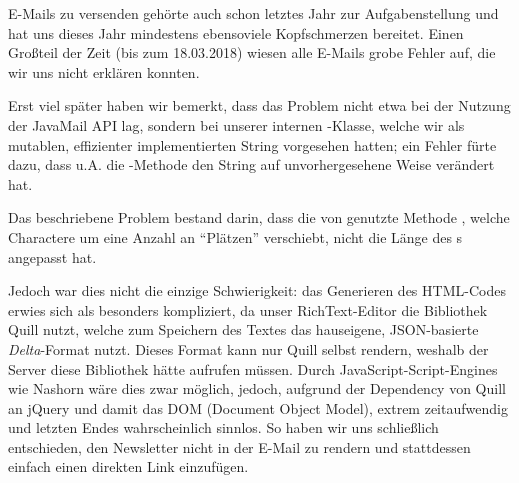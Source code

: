 E-Mails zu versenden gehörte auch schon letztes Jahr zur Aufgabenstellung
und hat uns dieses Jahr mindestens ebensoviele Kopfschmerzen bereitet.
Einen Großteil der Zeit (bis zum 18.03.2018)
wiesen alle E-Mails grobe Fehler auf,
die wir uns nicht erklären konnten.

Erst viel später haben wir bemerkt,
dass das Problem nicht etwa bei der Nutzung der JavaMail API lag,
sondern bei unserer internen -Klasse,
welche wir als mutablen,
effizienter implementierten String vorgesehen hatten;
ein Fehler fürte dazu,
dass u.A. die -Methode den String auf unvorhergesehene Weise verändert hat.

Das beschriebene Problem bestand darin,
dass die von  genutzte Methode ,
welche Charactere um eine Anzahl an ``Plätzen'' verschiebt,
nicht die Länge des s angepasst hat.

Jedoch war dies nicht die einzige Schwierigkeit:
das Generieren des HTML-Codes erwies sich als besonders kompliziert,
da unser RichText-Editor die Bibliothek Quill nutzt,
welche zum Speichern des Textes das hauseigene, JSON-basierte \emph{Delta}-Format nutzt.
Dieses Format kann nur Quill selbst rendern,
weshalb der Server diese Bibliothek hätte aufrufen müssen.
Durch JavaScript-Script-Engines wie Nashorn wäre dies zwar möglich,
jedoch,
aufgrund der Dependency von Quill an jQuery und damit das DOM (Document Object Model),
extrem zeitaufwendig und letzten Endes wahrscheinlich sinnlos.
So haben wir uns schließlich entschieden,
den Newsletter nicht in der E-Mail zu rendern und stattdessen einfach einen direkten Link einzufügen.
